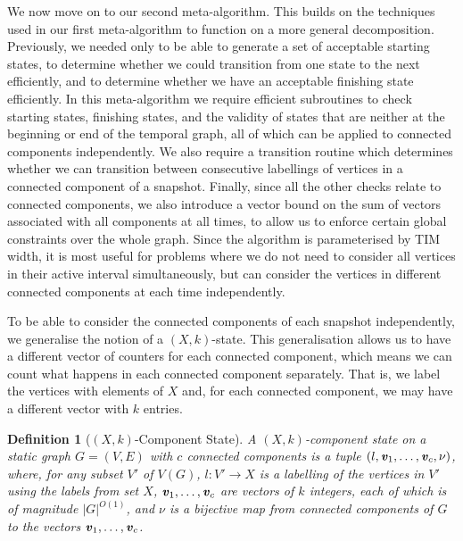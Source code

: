 \documentclass[a4paper,UKenglish,cleveref, autoref, thm-restate]{lipics-v2021} %
\newcounter{ctheorem}
\newtheorem{defn}[ctheorem]{Definition}
\begin{document}
We now move on to our second meta-algorithm. This builds on the techniques used in our first meta-algorithm to function on a more general decomposition. %
Previously, we needed only to be able to generate a set of acceptable starting states, to determine whether we could transition from one state to the next efficiently, and to determine whether we have an acceptable finishing state efficiently. In this meta-algorithm we require efficient subroutines to check starting states, finishing states, and the validity of states that are neither at the beginning or end of the temporal graph, all of which can be applied to connected components independently. We also require a transition routine which determines whether we can transition between consecutive labellings of vertices in a connected component of a snapshot. Finally, since all the other checks relate to connected components, we also introduce a vector bound on the sum of vectors associated with all components at all times, to allow us to enforce certain global constraints over the whole graph. Since the algorithm is parameterised by TIM width, it is most useful for problems where we do not need to consider all vertices in their active interval simultaneously, but can consider the vertices in different connected components at each time independently.  


To be able to consider the connected components of each snapshot independently, we generalise the notion of a $(X,k)$-state. This generalisation allows us to have a different vector of counters for each connected component, which means we can count what happens in each connected component separately. That is, we label the vertices with elements of $X$ and, for each connected component, we may have a different vector with $k$ entries. 
\begin{defn}[$(X,k)$-Component State]
    A $(X,k)$-component state on a static graph $G=(V,E)$ with $c$ connected components is a tuple $(l, \textbf{\emph{v}}_1,\ldots,\textbf{\emph{v}}_{c}, \nu)$, where, for any subset $V'$ of $V(G)$, $l : V' \to X$ is a labelling of the vertices in $V'$ using the labels from set $X$, $\textbf{\emph{v}}_1,\ldots,\textbf{\emph{v}}_{c}$ are vectors of $k$ integers, each of which is of magnitude $|G|^{O(1)}$, and $\nu$ is a bijective map from connected components of $G$ to the vectors $\textbf{\emph{v}}_1,\ldots, \textbf{\emph{v}}_c$.
\end{defn}
\end{document}

